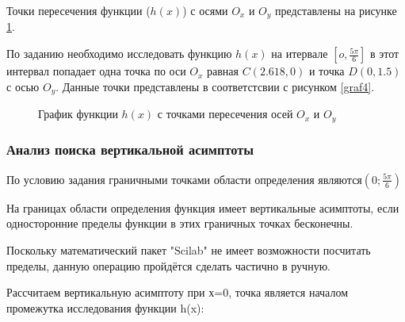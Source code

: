 \documentclass[russian,utf8,nocolumnxxxi,nocolumnxxxii]{eskdtext}
\begin{document}
Точки пересечения функции ($h(x)$) с осями $O_x$ и $O_y$ представлены на рисунке \ref{graf3}.

По заданию необходимо исследовать функцию $h(x)$ на итервале $[o, \frac{5\pi}{6}]$ \Rightarrow в этот интервал попадает одна точка по оси $O_x$ равная $C(2.618,0)$ и точка $D(0, 1.5)$ с осью $O_y$. Данные точки представлены в соответстсвии с рисунком \ref{graf4}.


 \begin{figure}[h!]
\begin{center}
\caption{График функции $h(x)$ с точками пересечения осей $O_x$ и $O_y$} \label{graf3}
\end{center}
\end{figure}

\subsubsection{Анализ поиска вертикальной асимптоты}

По условию задания граничными точками области определения являются$(0;\frac{5\pi}{6})$

На границах области определения функция имеет вертикальные асимптоты, если односторонние пределы функции в этих граничных точках бесконечны.

Поскольку математический пакет "Scilab" не имеет возможности посчитать пределы, данную операцию пройдётся сделать частично в ручную.



Рассчитаем вертикальную асимптоту при х=0, точка является началом промежутка исследования функции h(x):
\end{document}
